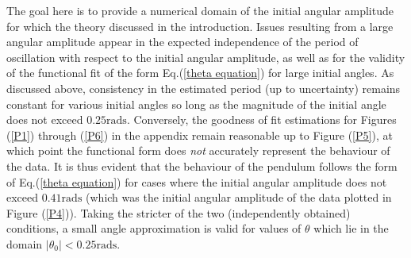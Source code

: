 The goal here is to provide a numerical domain of the initial angular amplitude for which the theory discussed in the introduction. Issues resulting from a large angular amplitude appear in the expected independence of the period of oscillation with respect to the initial angular amplitude, as well as for the validity of the functional fit of the form Eq.(\ref{theta equation}) for large initial angles. As discussed above, consistency in the estimated period (up to uncertainty) remains constant for various initial angles so long as the magnitude of the initial angle does not exceed $0.25\text{rads}$. Conversely, the goodness of fit estimations for Figures (\ref{P1}) through (\ref{P6}) in the appendix remain reasonable up to Figure (\ref{P5}), at which point the functional form does \emph{not} accurately represent the behaviour of the data. It is thus evident that the behaviour of the pendulum follows the form of Eq.(\ref{theta equation}) for cases where the initial angular amplitude does not exceed $0.41\text{rads}$ (which was the initial angular amplitude of the data plotted in Figure (\ref{P4})). Taking the stricter of the two (independently obtained) conditions, a small angle approximation is valid for values of $\theta$ which lie in the domain $|\theta_0| < 0.25\text{rads}$.\\[0.20cm]


